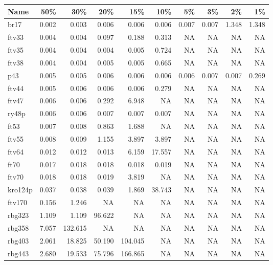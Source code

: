 \begin{table}
\centering
\begin{tabular}{l|r|r|r|r|r|r|r|r|r}
\hline
Name & 50\% & 30\% & 20\% & 15\% & 10\% & 5\% & 3\% & 2\% & 1\%\\
\hline
br17 & 0.002 & 0.003 & 0.006 & 0.006 & 0.006 & 0.007 & 0.007 & 1.348 & 1.348\\
\hline
ftv33 & 0.004 & 0.004 & 0.097 & 0.188 & 0.313 & NA & NA & NA & NA\\
\hline
ftv35 & 0.004 & 0.004 & 0.004 & 0.005 & 0.724 & NA & NA & NA & NA\\
\hline
ftv38 & 0.004 & 0.004 & 0.005 & 0.005 & 0.665 & NA & NA & NA & NA\\
\hline
p43 & 0.005 & 0.005 & 0.006 & 0.006 & 0.006 & 0.006 & 0.007 & 0.007 & 0.269\\
\hline
ftv44 & 0.005 & 0.006 & 0.006 & 0.006 & 0.279 & NA & NA & NA & NA\\
\hline
ftv47 & 0.006 & 0.006 & 0.292 & 6.948 & NA & NA & NA & NA & NA\\
\hline
ry48p & 0.006 & 0.006 & 0.007 & 0.007 & 0.007 & NA & NA & NA & NA\\
\hline
ft53 & 0.007 & 0.008 & 0.863 & 1.688 & NA & NA & NA & NA & NA\\
\hline
ftv55 & 0.008 & 0.009 & 1.155 & 3.897 & 3.897 & NA & NA & NA & NA\\
\hline
ftv64 & 0.012 & 0.012 & 0.013 & 6.159 & 17.557 & NA & NA & NA & NA\\
\hline
ft70 & 0.017 & 0.018 & 0.018 & 0.018 & 0.019 & NA & NA & NA & NA\\
\hline
ftv70 & 0.018 & 0.018 & 0.019 & 3.819 & NA & NA & NA & NA & NA\\
\hline
kro124p & 0.037 & 0.038 & 0.039 & 1.869 & 38.743 & NA & NA & NA & NA\\
\hline
ftv170 & 0.156 & 1.246 & NA & NA & NA & NA & NA & NA & NA\\
\hline
rbg323 & 1.109 & 1.109 & 96.622 & NA & NA & NA & NA & NA & NA\\
\hline
rbg358 & 7.057 & 132.615 & NA & NA & NA & NA & NA & NA & NA\\
\hline
rbg403 & 2.061 & 18.825 & 50.190 & 104.045 & NA & NA & NA & NA & NA\\
\hline
rbg443 & 2.680 & 19.533 & 75.796 & 166.865 & NA & NA & NA & NA & NA\\
\hline
\end{tabular}
\end{table}
